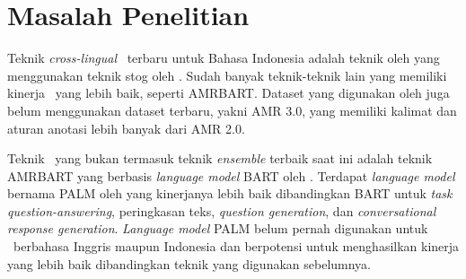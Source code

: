 \section{Masalah Penelitian}

Teknik \textit{cross-lingual} \amrparsing~terbaru untuk Bahasa Indonesia adalah teknik oleh \textcite{putra2022} yang menggunakan teknik stog oleh .
Sudah banyak teknik-teknik lain yang memiliki kinerja \amrparsing~yang lebih baik, seperti AMRBART.
Dataset yang digunakan oleh \textcite{putra2022} juga belum menggunakan dataset terbaru, yakni AMR 3.0, yang memiliki kalimat dan aturan anotasi lebih banyak dari AMR 2.0.

Teknik \amrparsing~yang bukan termasuk teknik \textit{ensemble} terbaik saat ini adalah teknik AMRBART yang berbasis \textit{language model} BART oleh \textcite{lewis2020}. Terdapat \textit{language model} bernama PALM oleh \textcite{bi2020} yang kinerjanya lebih baik dibandingkan BART untuk \textit{task} \textit{question-answering}, peringkasan teks, \textit{question generation}, dan \textit{conversational response generation}.
\textit{Language model} PALM belum pernah digunakan untuk \amrparsing~berbahasa Inggris maupun Indonesia dan berpotensi untuk menghasilkan kinerja yang lebih baik dibandingkan teknik yang digunakan sebelumnya.

